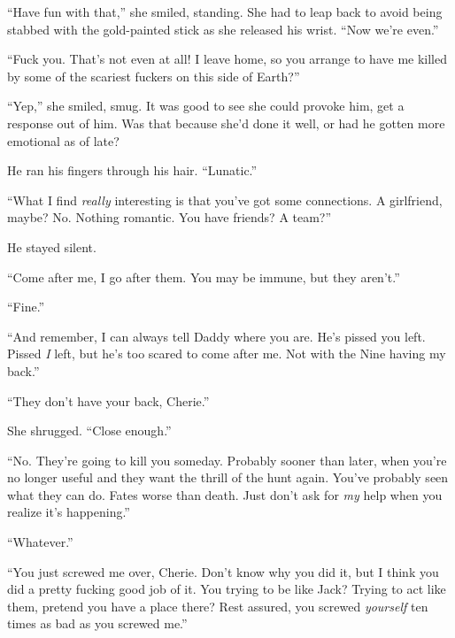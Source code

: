 ``Have fun with that,'' she smiled, standing.  She had to leap back to avoid being stabbed with the gold-painted stick as she released his wrist.  ``Now we're even.''



``Fuck you.  That's not even at all!  I leave home, so you arrange to have me killed by some of the scariest fuckers on this side of Earth?''



``Yep,'' she smiled, smug.  It was good to see she could provoke him, get a response out of him.  Was that because she'd done it well, or had he gotten more emotional as of late?



He ran his fingers through his hair.  ``Lunatic.''



``What I find \emph{really} interesting is that you've got some connections.  A girlfriend, maybe?  No.  Nothing romantic.  You have friends?  A team?''



He stayed silent.



``Come after me, I go after them.  You may be immune, but they aren't.''



``Fine.''



``And remember, I can always tell Daddy where you are.  He's pissed you left.  Pissed \emph{I }left, but he's too scared to come after me.  Not with the Nine having my back.''



``They don't have your back, Cherie.''



She shrugged.  ``Close enough.''



``No.  They're going to kill you someday.  Probably sooner than later, when you're no longer useful and they want the thrill of the hunt again.  You've probably seen what they can do.  Fates worse than death.  Just don't ask for \emph{my} help when you realize it's happening.''



``Whatever.''



``You just screwed me over, Cherie.  Don't know why you did it, but I think you did a pretty fucking good job of it.  You trying to be like Jack?  Trying to act like them, pretend you have a place there?  Rest assured, you screwed \emph{yourself }ten times as bad as you screwed me.''



